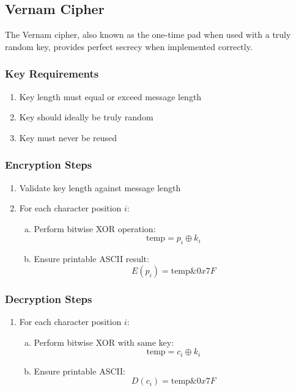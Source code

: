 \documentclass[titlepage]{article}
\begin{document}
\subsection{Vernam Cipher}
The Vernam cipher, also known as the one-time pad when used with a truly random key, provides perfect secrecy when implemented correctly.

\subsubsection{Key Requirements}
\begin{enumerate}[1.]
\item Key length must equal or exceed message length
\item Key should ideally be truly random
\item Key must never be reused
\end{enumerate}

\subsubsection{ Encryption Steps}
\begin{enumerate}[1.]
\item Validate key length against message length
\item For each character position $i$:
   \begin{enumerate}[a)]
   \item Perform bitwise XOR operation:
      \begin{equation}
      \text{temp} = p_i \oplus k_i
      \end{equation}
   \item Ensure printable ASCII result:
      \begin{equation}
      E(p_i) = \text{temp} \& 0x7F
      \end{equation}
   \end{enumerate}
\end{enumerate}

\subsubsection{ Decryption Steps}
\begin{enumerate}[1.]
\item For each character position $i$:
   \begin{enumerate}[a)]
   \item Perform bitwise XOR with same key:
      \begin{equation}
      \text{temp} = c_i \oplus k_i
      \end{equation}
   \item Ensure printable ASCII:
      \begin{equation}
      D(c_i) = \text{temp} \& 0x7F
      \end{equation}
   \end{enumerate}
\end{enumerate}
\end{document}
